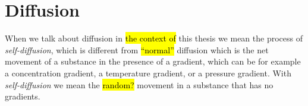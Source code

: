 

\section{Diffusion}
When we talk about diffusion in \hl{the context of} this thesis we mean the process of \emph{self-diffusion}, which is different from \hl{``normal''} diffusion which is the net movement of a substance in the presence of a gradient, which can be for example a concentration gradient, a temperature gradient, or a pressure gradient. With \emph{self-diffusion} we mean the \hl{random?} movement in a substance that has no gradients.


